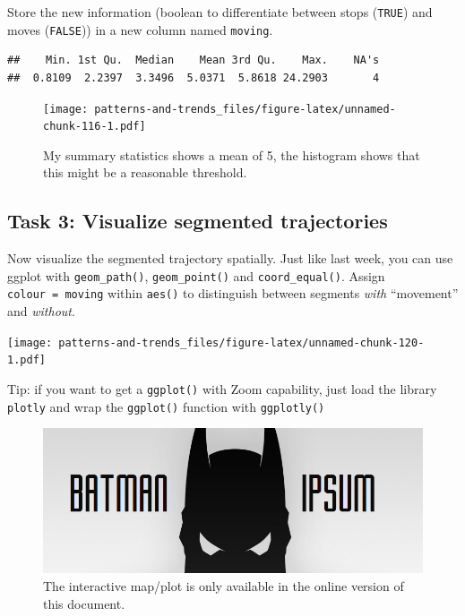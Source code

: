 \documentclass[]{book}
\begin{document}
Store the new information (boolean to differentiate between stops
(\texttt{TRUE}) and moves (\texttt{FALSE})) in a new column named
\texttt{moving}.

\begin{verbatim}
##    Min. 1st Qu.  Median    Mean 3rd Qu.    Max.    NA's 
##  0.8109  2.2397  3.3496  5.0371  5.8618 24.2903       4
\end{verbatim}

\begin{figure}
\centering
\texttt{[image: patterns-and-trends\_files/figure-latex/unnamed-chunk-116-1.pdf]}
\caption{\label{fig:unnamed-chunk-116}My summary statistics shows a mean of
5, the histogram shows that this might be a reasonable threshold.}
\end{figure}

\subsection{Task 3: Visualize segmented
trajectories}\label{task-3-visualize-segmented-trajectories}

Now visualize the segmented trajectory spatially. Just like last week,
you can use ggplot with \texttt{geom\_path()}, \texttt{geom\_point()}
and \texttt{coord\_equal()}. Assign \texttt{colour\ =\ moving} within
\texttt{aes()} to distinguish between segments \emph{with} ``movement''
and \emph{without}.

\texttt{[image: patterns-and-trends\_files/figure-latex/unnamed-chunk-120-1.pdf]}

Tip: if you want to get a \texttt{ggplot()} with Zoom capability, just
load the library \texttt{plotly} and wrap the \texttt{ggplot()} function
with \texttt{ggplotly()}

\begin{figure}
\centering
\includegraphics{02_Images/batman-ipsum.png}
\caption{The interactive map/plot is only available in the online
version of this document.}
\end{figure}
\end{document}
